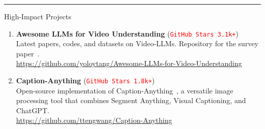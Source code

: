 \vspace{10pt}
\hrule
\begin{rSection}{High-Impact Projects}
    \begin{enumerate}[leftmargin=*]
              
        \item \textbf{Awesome LLMs for Video Understanding} (\texttt{\textcolor{red}{GitHub Stars 3.1k+}})\\
                  Latest papers, codes, and datasets on Video-LLMs. Repository for the survey paper~\cite{vidllmsurvey}. \\
                  \url{https://github.com/yoloytang/Awesome-LLMs-for-Video-Understanding}
        \item \textbf{Caption-Anything} (\texttt{\textcolor{red}{GitHub Stars 1.8k+}}) \\
              Open-source implementation of Caption-Anything~\cite{wang2023caption}, a versatile image processing tool that combines Segment Anything, Visual Captioning, and ChatGPT. \\
              \url{https://github.com/ttengwang/Caption-Anything}

    \end{enumerate}
\end{rSection}

              
                  
